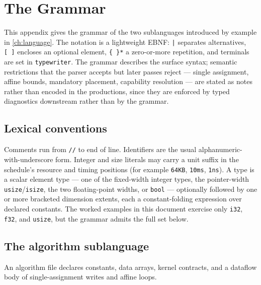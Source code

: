 \chapter{The \nuclang{} Grammar}\label{app:grammar}

This appendix gives the grammar of the two \nuclang{} sublanguages introduced by
example in \cref{ch:language}. The notation is a lightweight EBNF: \texttt{|}
separates alternatives, \texttt{[\,]} encloses an optional element,
\texttt{\{\,\}*} a zero-or-more repetition, and terminals are set in
\texttt{typewriter}. The grammar describes the surface syntax; semantic
restrictions that the parser accepts but later passes reject --- single assignment,
affine bounds, mandatory placement, capability resolution --- are stated as notes
rather than encoded in the productions, since they are enforced by typed
diagnostics downstream rather than by the grammar.

\section{Lexical conventions}

Comments run from \texttt{//} to end of line. Identifiers are the usual
alphanumeric-with-underscore form. Integer and size literals may carry a unit
suffix in the schedule's resource and timing positions (for example \texttt{64KB},
\texttt{10ms}, \texttt{1ns}). A type is a scalar element type --- one of the
fixed-width integer types, the pointer-width \texttt{usize}/\texttt{isize}, the two
floating-point widths, or \texttt{bool} --- optionally followed by one or more
bracketed dimension extents, each a constant-folding expression over declared
constants. The worked examples in this document exercise only \texttt{i32},
\texttt{f32}, and \texttt{usize}, but the grammar admits the full set below.

\section{The algorithm sublanguage}

An algorithm file declares constants, data arrays, kernel contracts, and a dataflow
body of single-assignment writes and affine loops.

